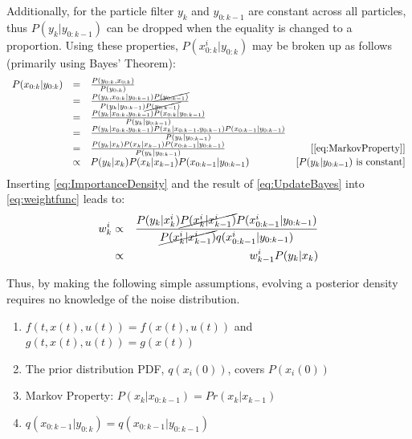 Additionally, for the particle filter $y_k$ and $y_{0:k-1}$ are 
constant across all particles, thus $P(y_k| y_{0:k-1})$ can
be dropped when the equality is changed to a proportion. 
Using these properties, $P(x^i_{0:k} | y_{0:k})$ may be broken up as follows 
(primarily using Bayes' Theorem):
\begin{equation}
\begin{array}{lclr}
P(x_{0:k} | y_{0:k}) & = & \frac{P(y_{0:k}, x_{0:k})}{P(y_{0:k})} & \\
 & = & \frac{P(y_k, x_{0:k} | y_{0:k-1}) \cancel{P(y_{0:k-1})}}{P(y_k | y_{0:k-1}) \cancel{P(y_{0:k-1})}} & \\
 & = & \frac{P(y_k| x_{0:k}, y_{0:k-1}) P(x_{0:k} | y_{0:k-1})}{P(y_k | y_{0:k-1}) } & \\
 & = & \frac{P(y_k| x_{0:k}, y_{0:k-1}) P(x_k | x_{0:k-1}, y_{0:k-1}) P(x_{0:k-1} | y_{0:k-1})}{P(y_k | y_{0:k-1})} &  \\
& = & \frac{P(y_k| x_k) P(x_k | x_{k-1}) P(x_{0:k-1} | y_{0:k-1})}{P(y_k | y_{0:k-1})}  & [\text{\autoref{eq:MarkovProperty}}]\\
& \propto & P(y_k| x_k) P(x_k | x_{k-1}) P(x_{0:k-1} | y_{0:k-1}) & [P(y_k|y_{0:k-1}) \text{ is constant}]
 \end{array}
 \label{eq:UpdateBayes}
\end{equation}
Inserting \autoref{eq:ImportanceDensity} and the result of \autoref{eq:UpdateBayes}
into \autoref{eq:weightfunc} leads to:
\begin{eqnarray}
w^i_k & \propto & \frac{P(y_k| x^i_k) \cancel{P(x^i_k | x^i_{k-1})} P(x^i_{0:k-1} | y_{0:k-1})}
                         {\cancel{P(x^i_k | x^i_{k-1})}q(x^i_{0:k-1} | y_{0:k-1})} \nonumber \\
& \propto & w^i_{k-1}P(y_k| x_k) 
\label{eq:weightevolve}
\end{eqnarray}

Thus, by making the following simple assumptions, evolving a posterior
density  requires no knowledge of the noise distribution.
\begin{enumerate}
\item $f(t, x(t), u(t)) = f(x(t), u(t))$ and $g(t, x(t), u(t)) = g(x(t))$ 
\item The prior distribution PDF, $q(x_i(0))$, covers $P(x_i(0))$
\item Markov Property: $P(x_k | x_{0:k-1}) = Pr(x_k | x_{k-1})$
\item $q(x_{0:k-1} | y_{0:k}) = q(x_{0:k-1} | y_{0:k-1})$
\end{enumerate}

